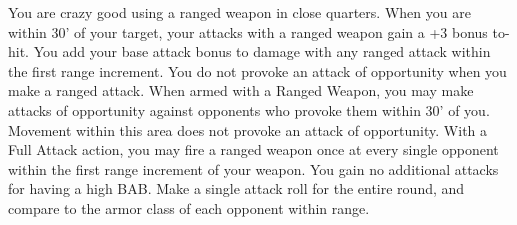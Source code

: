 \combatfeat
{You are crazy good using a ranged weapon in close quarters.}
{When you are within 30' of your target, your attacks with a ranged weapon gain a +3 bonus to-hit.}
{You add your base attack bonus to damage with any ranged attack within the first range increment.}
{You do not provoke an attack of opportunity when you make a ranged attack.}
{When armed with a Ranged Weapon, you may make attacks of opportunity against opponents who provoke them within 30' of you. Movement within this area does not provoke an attack of opportunity.}
{With a Full Attack action, you may fire a ranged weapon once at every single opponent within the first range increment of your weapon. You gain no additional attacks for having a high BAB. Make a single attack roll for the entire round, and compare to the armor class of each opponent within range.}